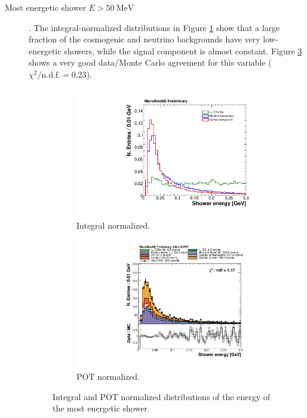 \begin{description}
\item[Most energetic shower $E > 50~\mathrm{MeV}$]. The integral-normalized distributions in Figure \ref{fig:showere_integral} show that a large fraction of the cosmogenic and neutrino backgrounds have very low-energetic showers, while the signal component is almost constant. Figure \ref{fig:showere_pot} shows a very good data/Monte Carlo agreement for this variable ($\chi^2 / \mathrm{n.d.f.} = 0.23$).

\begin{figure}[htbp]
\centering
  \begin{subfigure}{0.45\textwidth}
    \includegraphics[width=\linewidth]{figures/h_shower_energy_norm.pdf}
    \caption{Integral normalized.} \label{fig:showere_integral}
  \end{subfigure}
    \begin{subfigure}{0.45\textwidth}
    \includegraphics[width=\linewidth]{figures/h_shower_energy.pdf}
    \caption{POT normalized.} \label{fig:showere_pot}
  \end{subfigure}
  \caption{Integral and POT normalized distributions of the energy of the most energetic shower.}
\end{figure}


\end{description}
